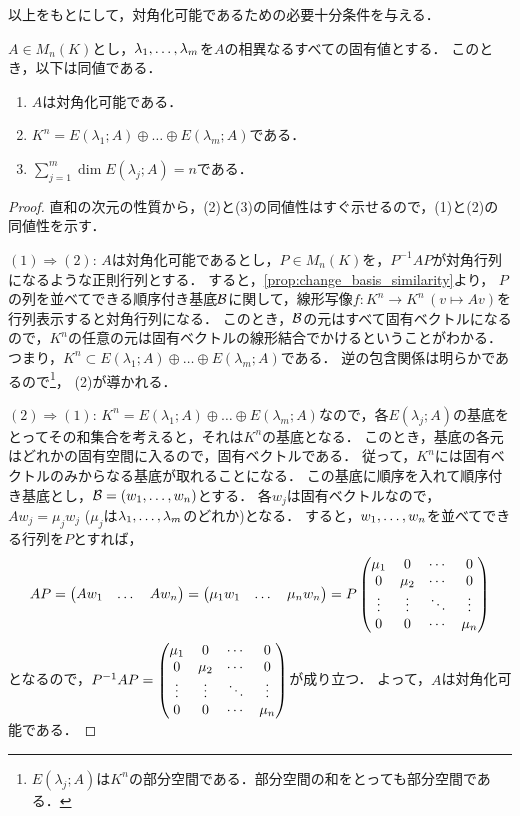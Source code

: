 以上をもとにして，対角化可能であるための必要十分条件を与える．
\begin{thm}\label{thm:diagonalize}
    $A \in M_n(K)$とし，$\lambda_{1},\dots,\lambda_{m}$を$A$の相異なるすべての固有値とする．
    このとき，以下は同値である．
    \begin{enumerate}
        \item $A$は対角化可能である．
        \item $K^n = E(\lambda_1;A) \oplus \dots \oplus E(\lambda_m;A)$である．
        \item $\displaystyle \sum_{j=1}^m \dim E(\lambda_j;A) = n$である．
    \end{enumerate}
\end{thm}
\begin{proof}
    直和の次元の性質から，(2)と(3)の同値性はすぐ示せるので，(1)と(2)の同値性を示す．

    $(1) \Rightarrow (2)$:
    $A$は対角化可能であるとし，$P \in M_n(K)$を，$P^{-1}AP$が対角行列になるような正則行列とする．
    すると，\cref{prop:change_basis_similarity}より，
    $P$の列を並べてできる順序付き基底$\mathcal{B}$に関して，線形写像$f\colon K^n \to K^n\,(v \mapsto Av)$を行列表示すると対角行列になる．
    このとき，$\mathcal{B}$の元はすべて固有ベクトルになるので，$K^n$の任意の元は固有ベクトルの線形結合でかけるということがわかる．
    つまり，$K^n \subset E(\lambda_1;A) \oplus \dots \oplus E(\lambda_m;A)$である．
    逆の包含関係は明らかであるので\footnote{$E(\lambda_j;A)$は$K^n$の部分空間である．部分空間の和をとっても部分空間である．}，
    (2)が導かれる．

    $(2) \Rightarrow (1)$:
    $K^n = E(\lambda_1;A) \oplus \dots \oplus E(\lambda_m;A)$なので，各$E(\lambda_j;A)$の基底をとってその和集合を考えると，それは$K^n$の基底となる．
    このとき，基底の各元はどれかの固有空間に入るので，固有ベクトルである．
    従って，$K^n$には固有ベクトルのみからなる基底が取れることになる．
    この基底に順序を入れて順序付き基底とし，$\mathcal{B}=(w_1,\dots,w_n)$とする．
    各$w_j$は固有ベクトルなので，$Aw_j = \mu_j w_j$ ($\mu_j$は$\lambda_{1},\dots,\lambda_{m}$のどれか)となる．
    すると，$w_{1},\dots,w_{n}$を並べてできる行列を$P$とすれば，
    \[
        AP = \begin{pmatrix} Aw_1 & \dots & Aw_n \end{pmatrix} = \begin{pmatrix} \mu_1 w_1 & \dots & \mu_n w_n \end{pmatrix} = P \begin{pmatrix} 
            \mu_1 & 0 & \cdots & 0 \\
            0 & \mu_2 & \cdots & 0 \\
            \vdots & \vdots & \ddots & \vdots \\
            0 & 0 & \cdots & \mu_n \end{pmatrix} 
    \]
    となるので，$P^{-1}AP=\begin{pmatrix} 
        \mu_1 & 0 & \cdots & 0 \\
        0 & \mu_2 & \cdots & 0 \\
        \vdots & \vdots & \ddots & \vdots \\
        0 & 0 & \cdots & \mu_n \end{pmatrix}$が成り立つ．
    よって，$A$は対角化可能である．
\end{proof}
